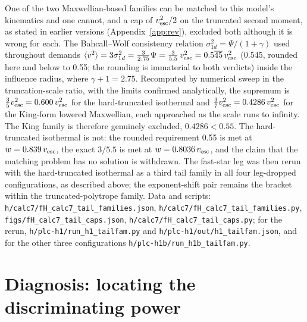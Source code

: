 \documentclass[11pt]{article}
\begin{document}
One of the two Maxwellian-based families can be matched to this model's kinematics and one cannot, and a cap of $v_{\rm esc}^{2}/2$ on the truncated second moment, as stated in earlier versions (Appendix~\ref{app:rev}), excluded both although it is wrong for each. The Bahcall--Wolf consistency relation $\sigma_{1d}^{2} = \Psi/(1+\gamma)$ used throughout demands $\langle v^{2}\rangle = 3\sigma_{1d}^{2} = \tfrac{3}{2.75}\Psi = \tfrac{3}{5.5}\,v_{\rm esc}^{2} = 0.5\overline{45}\,v_{\rm esc}^{2}$ (0.545, rounded here and below to 0.55; the rounding is immaterial to both verdicts) inside the influence radius, where $\gamma + 1 = 2.75$. Recomputed by numerical sweep in the truncation-scale ratio, with the limits confirmed analytically, the supremum is $\tfrac{3}{5}v_{\rm esc}^{2} = 0.600\,v_{\rm esc}^{2}$ for the hard-truncated isothermal and $\tfrac{3}{7}v_{\rm esc}^{2} = 0.4286\,v_{\rm esc}^{2}$ for the King-form lowered Maxwellian, each approached as the scale runs to infinity. The King family is therefore genuinely excluded, $0.4286 < 0.55$. The hard-truncated isothermal is not: the rounded requirement 0.55 is met at $w = 0.839\,v_{\rm esc}$, the exact $3/5.5$ is met at $w = 0.8036\,v_{\rm esc}$, and the claim that the matching problem has no solution is withdrawn. The fast-star leg was then rerun with the hard-truncated isothermal as a third tail family in all four leg-dropped configurations, as described above; the exponent-shift pair remains the bracket within the truncated-polytrope family. Data and scripts: \texttt{h/calc7/fH\_\allowbreak calc7\_\allowbreak tail\_\allowbreak families.json}, \texttt{h/calc7/fH\_\allowbreak calc7\_\allowbreak tail\_\allowbreak families.py}, \texttt{figs/fH\_\allowbreak calc7\_\allowbreak tail\_\allowbreak caps.json}, \texttt{h/calc7/fH\_\allowbreak calc7\_\allowbreak tail\_\allowbreak caps.py}; for the rerun, \texttt{h/plc-h1/run\_\allowbreak h1\_\allowbreak tailfam.py} and \texttt{h/plc-h1/out/h1\_\allowbreak tailfam.json}, and for the other three configurations \texttt{h/plc-h1b/run\_\allowbreak h1b\_\allowbreak tailfam.py}.

\section{Diagnosis: locating the discriminating power}
\label{sec:diagnosis}
\end{document}
